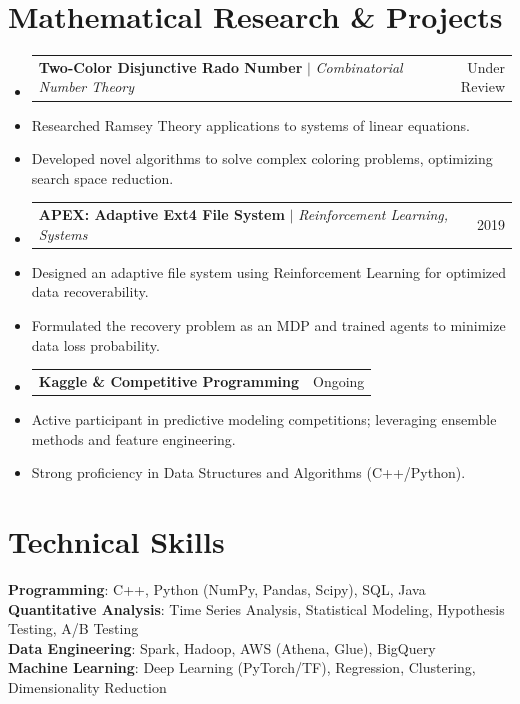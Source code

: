\documentclass[a4paper,10pt]{article}
\makeatletter
\newcommand{\resumeItem}[1]{
  \item\small{#1 \vspace{-2pt}}
}
\newcommand{\resumeProjectHeading}[2]{
    \item
    \begin{tabular*}{0.97\textwidth}{l@{\extracolsep{\fill}}r}
      \small#1 & #2 \\
    \end{tabular*}\vspace{-5pt}
}
\makeatother
\begin{document}
\section{Mathematical Research \& Projects}
  \begin{itemize}[leftmargin=0.15in, label={}]

    \resumeProjectHeading
      {\textbf{Two-Color Disjunctive Rado Number} $|$ \emph{Combinatorial Number Theory}}{Under Review}
      \resumeItem{Researched Ramsey Theory applications to systems of linear equations.}
      \resumeItem{Developed novel algorithms to solve complex coloring problems, optimizing search space reduction.}

    \resumeProjectHeading
      {\textbf{APEX: Adaptive Ext4 File System} $|$ \emph{Reinforcement Learning, Systems}}{2019}
      \resumeItem{Designed an adaptive file system using Reinforcement Learning for optimized data recoverability.}
      \resumeItem{Formulated the recovery problem as an MDP and trained agents to minimize data loss probability.}

    \resumeProjectHeading
      {\textbf{Kaggle \& Competitive Programming}}{Ongoing}
      \resumeItem{Active participant in predictive modeling competitions; leveraging ensemble methods and feature engineering.}
      \resumeItem{Strong proficiency in Data Structures and Algorithms (C++/Python).}

  \end{itemize}


\section{Technical Skills}
 \begin{itemize}[leftmargin=0.15in, label={}]
    \small{\item{
     \textbf{Programming}{: C++, Python (NumPy, Pandas, Scipy), SQL, Java} \\
     \textbf{Quantitative Analysis}{: Time Series Analysis, Statistical Modeling, Hypothesis Testing, A/B Testing} \\
     \textbf{Data Engineering}{: Spark, Hadoop, AWS (Athena, Glue), BigQuery} \\
     \textbf{Machine Learning}{: Deep Learning (PyTorch/TF), Regression, Clustering, Dimensionality Reduction}
    }}
 \end{itemize}
\end{document}
